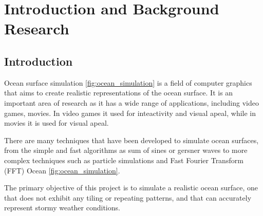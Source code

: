 \chapter{Introduction and Background Research}



\label{chapter1}

\section{Introduction}


Ocean surface simulation \ref{fig:ocean_simulation} is a field of computer graphics that aims to create realistic representations of the ocean surface.
It is an important area of research as it has a wide range of applications, including video games, movies.
In video games it used for inteactivity and visual apeal, while in movies it is used for visual apeal. 

There are many techniques that have been developed to simulate ocean surfaces, from the simple and fast algorithms as 
sum of sines or gersner waves to more complex techniques such as particle simulations and Fast Fourier Transform (FFT) Ocean \ref{fig:ocean_simulation}.

The primary objective of this project is to simulate a realistic ocean surface, 
one that does not exhibit any tiling or repeating patterns, and that can accurately 
represent stormy weather conditions.

